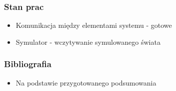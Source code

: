 \documentclass[17pt]{beamer}
\begin{document}
\begin{frame}[shrink=5]
 \frametitle{\vspace{22px}Stan prac}
 \begin{itemize}
  \item{Komunikacja między elementami systemu - gotowe}
  \item{Symulator - wczytywanie symulowanego świata}
 \end{itemize}
\end{frame}

\begin{frame}[shrink=5]
 \frametitle{\vspace{22px}Bibliografia}
 \begin{itemize}
  \item{Na podstawie przygotowanego podsumowania}
 \end{itemize}
\end{frame}
\end{document}
